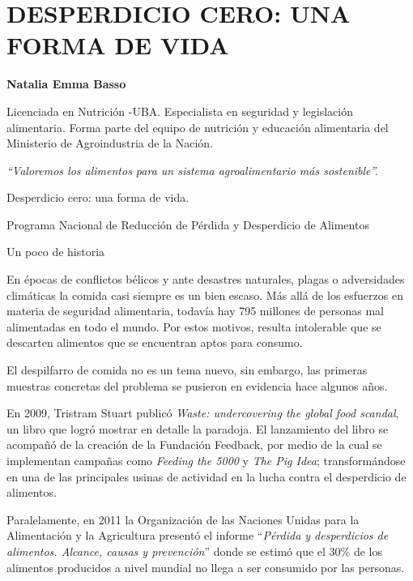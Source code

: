 \chapter{DESPERDICIO CERO: UNA FORMA DE VIDA}


\textbf{Natalia Emma Basso}

Licenciada en Nutrición -UBA. Especialista en seguridad y legislación
alimentaria. Forma parte del equipo de nutrición y educación alimentaria
del Ministerio de Agroindustria de la Nación.

\emph{``Valoremos los alimentos para un sistema agroalimentario más
sostenible''.}

Desperdicio cero: una forma de vida.

Programa Nacional de Reducción de Pérdida y Desperdicio de Alimentos

Un poco de historia

En épocas de conflictos bélicos y ante desastres naturales, plagas o
adversidades climáticas la comida casi siempre es un bien escaso. Más
allá de los esfuerzos en materia de seguridad alimentaria, todavía hay
795 millones de personas mal alimentadas en todo el mundo. Por estos
motivos, resulta intolerable que se descarten alimentos que se
encuentran aptos para consumo.

El despilfarro de comida no es un tema nuevo, sin embargo, las primeras
muestras concretas del problema se pusieron en evidencia hace algunos
años.

En 2009, Tristram Stuart publicó \emph{Waste: undercovering the global
food scandal}, un libro que logró mostrar en detalle la paradoja. El
lanzamiento del libro se acompañó de la creación de la Fundación
Feedback, por medio de la cual se implementan campañas como
\emph{Feeding the 5000} y \emph{The Pig Idea}; transformándose en una de
las principales usinas de actividad en la lucha contra el desperdicio de
alimentos.

Paralelamente, en 2011 la Organización de las Naciones Unidas para la
Alimentación y la Agricultura presentó el informe ``\emph{Pérdida y
desperdicios de alimentos. Alcance, causas y prevención}'' donde se
estimó que el 30\% de los alimentos producidos a nivel mundial no llega
a ser consumido por las personas.

